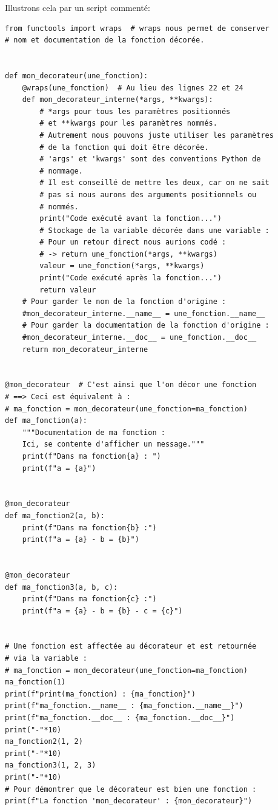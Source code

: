 \documentclass[a4paper,11pt]{book}
\begin{document}
Illustrons cela par un script commenté:
\begin{lstlisting}[caption=Fonction avec décorateur]
from functools import wraps  # wraps nous permet de conserver 
# nom et documentation de la fonction décorée.


def mon_decorateur(une_fonction):
    @wraps(une_fonction)  # Au lieu des lignes 22 et 24
    def mon_decorateur_interne(*args, **kwargs):
        # *args pour tous les paramètres positionnés
        # et **kwargs pour les paramètres nommés.
        # Autrement nous pouvons juste utiliser les paramètres  
        # de la fonction qui doit être décorée.
        # 'args' et 'kwargs' sont des conventions Python de 
        # nommage.
        # Il est conseillé de mettre les deux, car on ne sait 
        # pas si nous aurons des arguments positionnels ou 
        # nommés.
        print("Code exécuté avant la fonction...")
        # Stockage de la variable décorée dans une variable :
        # Pour un retour direct nous aurions codé :
        # -> return une_fonction(*args, **kwargs)
        valeur = une_fonction(*args, **kwargs)
        print("Code exécuté après la fonction...")
        return valeur
    # Pour garder le nom de la fonction d'origine :
    #mon_decorateur_interne.__name__ = une_fonction.__name__
    # Pour garder la documentation de la fonction d'origine :
    #mon_decorateur_interne.__doc__ = une_fonction.__doc__
    return mon_decorateur_interne


@mon_decorateur  # C'est ainsi que l'on décor une fonction
# ==> Ceci est équivalent à :
# ma_fonction = mon_decorateur(une_fonction=ma_fonction)
def ma_fonction(a):
    """Documentation de ma fonction :
    Ici, se contente d'afficher un message."""
    print(f"Dans ma fonction{a} : ")
    print(f"a = {a}")


@mon_decorateur
def ma_fonction2(a, b):
    print(f"Dans ma fonction{b} :")
    print(f"a = {a} - b = {b}")


@mon_decorateur
def ma_fonction3(a, b, c):
    print(f"Dans ma fonction{c} :")
    print(f"a = {a} - b = {b} - c = {c}")


# Une fonction est affectée au décorateur et est retournée 
# via la variable :
# ma_fonction = mon_decorateur(une_fonction=ma_fonction)
ma_fonction(1)
print(f"print(ma_fonction) : {ma_fonction}")
print(f"ma_fonction.__name__ : {ma_fonction.__name__}")
print(f"ma_fonction.__doc__ : {ma_fonction.__doc__}")
print("-"*10)
ma_fonction2(1, 2)
print("-"*10)
ma_fonction3(1, 2, 3)
print("-"*10)
# Pour démontrer que le décorateur est bien une fonction :
print(f"La fonction 'mon_decorateur' : {mon_decorateur}")
\end{lstlisting}
\medskip
\end{document}
